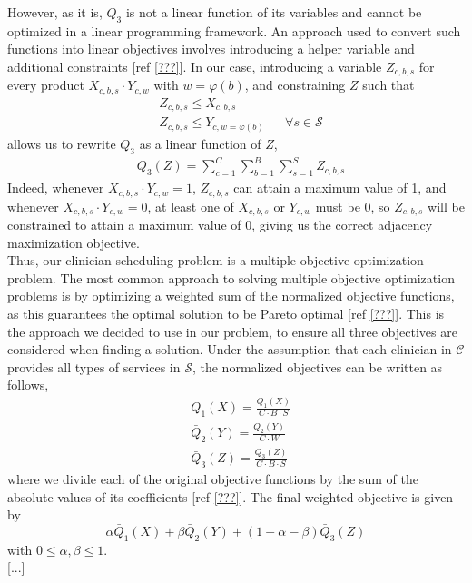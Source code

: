 However, as it is, $Q_3$ is not a linear function of its variables and cannot be optimized in a linear programming framework. An approach used to convert such functions into linear objectives involves introducing a helper variable and additional constraints [ref \ref{???}]. In our case, introducing a variable $Z_{c, b, s}$ for every product $X_{c, b, s} \cdot Y_{c, w}$ with $w = \varphi(b)$, and constraining $Z$ such that 
\begin{align}
	&Z_{c, b, s} \leq X_{c, b, s} \\
	&Z_{c, b, s} \leq Y_{c, w=\varphi(b)} &&\forall s\in\mathcal{S}
\end{align}
allows us to rewrite $Q_3$ as a linear function of $Z$,
\begin{align}
	&Q_3(Z) = \sum_{c=1}^{C} \sum_{b=1}^{B} \sum_{s=1}^{S} Z_{c, b, s}
\end{align}
Indeed, whenever $X_{c, b, s} \cdot Y_{c, w} = 1$, $Z_{c, b, s}$ can attain a maximum value of 1, and whenever $X_{c, b, s} \cdot Y_{c, w} = 0$, at least one of $X_{c, b, s}$ or $Y_{c, w}$ must be 0, so $Z_{c, b, s}$ will be constrained to attain a maximum value of 0, giving us the correct adjacency maximization objective. \\

Thus, our clinician scheduling problem is a multiple objective optimization problem. The most common approach to solving multiple objective optimization problems is by optimizing a weighted sum of the normalized objective functions, as this guarantees the optimal solution to be Pareto optimal [ref \ref{???}]. This is the approach we decided to use in our problem, to ensure all three objectives are considered when finding a solution. Under the assumption that each clinician in $\mathcal{C}$ provides all types of services in $\mathcal{S}$, the normalized objectives can be written as follows,
\begin{align}
	&\bar{Q}_1(X) = \frac{Q_1(X)}{C \cdot B \cdot S} \tag{Block Requests} \label{eqn:norm-obj-block-requests}\\
	&\bar{Q}_2(Y) = \frac{Q_2(Y)}{C \cdot W} \tag{Weekend Requests} \label{eqn:norm-obj-weekend-requests} \\
	&\bar{Q}_3(Z) = \frac{Q_3(Z)}{C \cdot B \cdot S} \tag{Block-Weekend Adjacency} \label{eqn:norm-obj-block-weekend-adj}
\end{align}
where we divide each of the original objective functions by the sum of the absolute values of its coefficients [ref \ref{???}]. The final weighted objective is given by
\begin{equation}
	\alpha \bar{Q}_1(X) + \beta \bar{Q}_2(Y) + (1 - \alpha - \beta) \bar{Q}_3(Z)
\end{equation}
with $0 \leq \alpha, \beta \leq 1$. \\

[...]